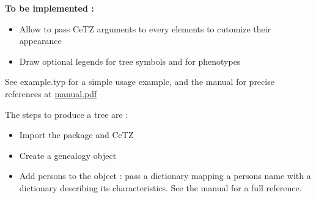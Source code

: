 \textbf{To be implemented :}

\begin{itemize}
\tightlist
\item
  Allow to pass CeTZ arguments to every elements to cutomize their
  appearance
\item
  Draw optional legends for tree symbols and for phenotypes
\end{itemize}

See example.typ for a simple usage example, and the manual for precise
references at
\href{https://codeberg.org/attachments/cfdad2b7-52ae-4e18-8d7b-453fadc45532}{manual.pdf}

The steps to produce a tree are :

\begin{itemize}
\tightlist
\item
  Import the package and CeTZ
\end{itemize}

\begin{Shaded}
\begin{Highlighting}[]
\end{Highlighting}
\end{Shaded}

\begin{itemize}
\tightlist
\item
  Create a genealogy object
\end{itemize}

\begin{Shaded}
\begin{Highlighting}[]
\end{Highlighting}
\end{Shaded}

\begin{itemize}
\tightlist
\item
  Add persons to the object : pass a dictionary mapping a persons name
  with a dictionary describing its characteristics. See the manual for a
  full reference.
\end{itemize}

\begin{Shaded}
\begin{Highlighting}[]
\NormalTok{  (}
\NormalTok{  )}
\NormalTok{)}
\end{Highlighting}
\end{Shaded}

